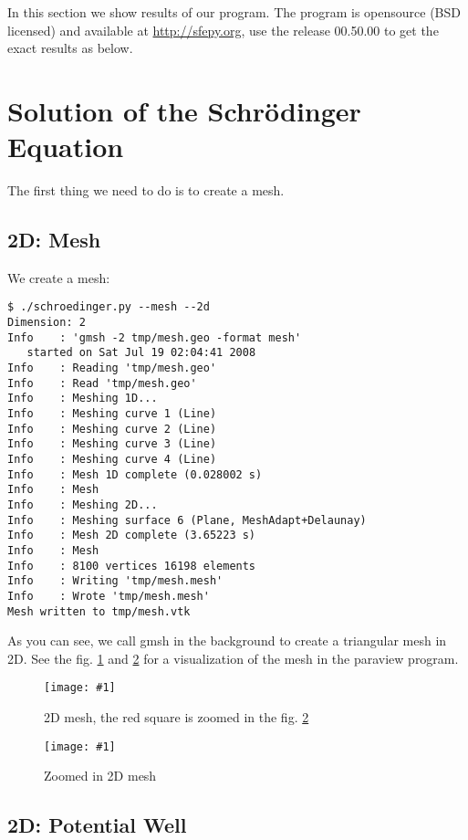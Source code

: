In this section we show results of our program. The program is opensource (BSD
licensed) and available at \url{http://sfepy.org}, use the release 00.50.00 to
get the exact results as below.

\section{Solution of the Schr\"odinger Equation}

The first thing we need to do is to create a mesh.

\subsection{2D: Mesh}

We create a mesh:

\begin{lstlisting}
$ ./schroedinger.py --mesh --2d
Dimension: 2
Info    : 'gmsh -2 tmp/mesh.geo -format mesh'
   started on Sat Jul 19 02:04:41 2008
Info    : Reading 'tmp/mesh.geo'
Info    : Read 'tmp/mesh.geo'
Info    : Meshing 1D...
Info    : Meshing curve 1 (Line)
Info    : Meshing curve 2 (Line)
Info    : Meshing curve 3 (Line)
Info    : Meshing curve 4 (Line)
Info    : Mesh 1D complete (0.028002 s)
Info    : Mesh
Info    : Meshing 2D...
Info    : Meshing surface 6 (Plane, MeshAdapt+Delaunay)
Info    : Mesh 2D complete (3.65223 s)
Info    : Mesh
Info    : 8100 vertices 16198 elements
Info    : Writing 'tmp/mesh.mesh'
Info    : Wrote 'tmp/mesh.mesh'
Mesh written to tmp/mesh.vtk
\end{lstlisting}

As you can see, we call gmsh\cite{gmsh} in the background to create a
triangular mesh in 2D.
See the fig. \ref{fig:mesh2d} and \ref{fig:mesh2d2} for a visualization of the
mesh in the paraview\cite{paraview} program.

\def\fig#1#2#3{%
\begin{figure}[htp]
\centering
\texttt{[image: \#1]}
\caption{#3}\label{#2}
\end{figure}
}

\fig{images/mesh1-r.pdf}{fig:mesh2d}{2D mesh, the red square is zoomed in the fig.  \ref{fig:mesh2d2}}

\fig{images/mesh4.png}{fig:mesh2d2}{Zoomed in 2D mesh}

\subsection{2D: Potential Well}


